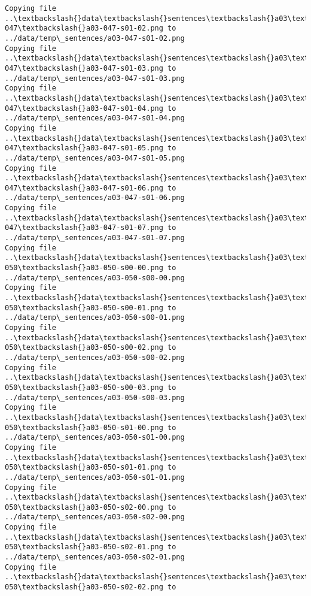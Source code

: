\documentclass[11pt]{article}
\begin{document}
\begin{Verbatim}[commandchars=\\\{\}]
Copying file ..\textbackslash{}data\textbackslash{}sentences\textbackslash{}a03\textbackslash{}a03-047\textbackslash{}a03-047-s01-02.png to
../data/temp\_sentences/a03-047-s01-02.png
Copying file ..\textbackslash{}data\textbackslash{}sentences\textbackslash{}a03\textbackslash{}a03-047\textbackslash{}a03-047-s01-03.png to
../data/temp\_sentences/a03-047-s01-03.png
Copying file ..\textbackslash{}data\textbackslash{}sentences\textbackslash{}a03\textbackslash{}a03-047\textbackslash{}a03-047-s01-04.png to
../data/temp\_sentences/a03-047-s01-04.png
Copying file ..\textbackslash{}data\textbackslash{}sentences\textbackslash{}a03\textbackslash{}a03-047\textbackslash{}a03-047-s01-05.png to
../data/temp\_sentences/a03-047-s01-05.png
Copying file ..\textbackslash{}data\textbackslash{}sentences\textbackslash{}a03\textbackslash{}a03-047\textbackslash{}a03-047-s01-06.png to
../data/temp\_sentences/a03-047-s01-06.png
Copying file ..\textbackslash{}data\textbackslash{}sentences\textbackslash{}a03\textbackslash{}a03-047\textbackslash{}a03-047-s01-07.png to
../data/temp\_sentences/a03-047-s01-07.png
Copying file ..\textbackslash{}data\textbackslash{}sentences\textbackslash{}a03\textbackslash{}a03-050\textbackslash{}a03-050-s00-00.png to
../data/temp\_sentences/a03-050-s00-00.png
Copying file ..\textbackslash{}data\textbackslash{}sentences\textbackslash{}a03\textbackslash{}a03-050\textbackslash{}a03-050-s00-01.png to
../data/temp\_sentences/a03-050-s00-01.png
Copying file ..\textbackslash{}data\textbackslash{}sentences\textbackslash{}a03\textbackslash{}a03-050\textbackslash{}a03-050-s00-02.png to
../data/temp\_sentences/a03-050-s00-02.png
Copying file ..\textbackslash{}data\textbackslash{}sentences\textbackslash{}a03\textbackslash{}a03-050\textbackslash{}a03-050-s00-03.png to
../data/temp\_sentences/a03-050-s00-03.png
Copying file ..\textbackslash{}data\textbackslash{}sentences\textbackslash{}a03\textbackslash{}a03-050\textbackslash{}a03-050-s01-00.png to
../data/temp\_sentences/a03-050-s01-00.png
Copying file ..\textbackslash{}data\textbackslash{}sentences\textbackslash{}a03\textbackslash{}a03-050\textbackslash{}a03-050-s01-01.png to
../data/temp\_sentences/a03-050-s01-01.png
Copying file ..\textbackslash{}data\textbackslash{}sentences\textbackslash{}a03\textbackslash{}a03-050\textbackslash{}a03-050-s02-00.png to
../data/temp\_sentences/a03-050-s02-00.png
Copying file ..\textbackslash{}data\textbackslash{}sentences\textbackslash{}a03\textbackslash{}a03-050\textbackslash{}a03-050-s02-01.png to
../data/temp\_sentences/a03-050-s02-01.png
Copying file ..\textbackslash{}data\textbackslash{}sentences\textbackslash{}a03\textbackslash{}a03-050\textbackslash{}a03-050-s02-02.png to

\end{Verbatim}
\end{document}
